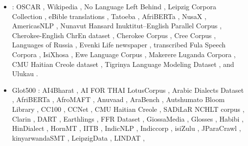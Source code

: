 \documentclass[11pt]{article}
\begin{document}
\begin{itemize}[leftmargin=0.5cm,itemsep=0.1cm,topsep=0.25cm]
\item \citet{chang-etal-2023-multilinguality}:\newline
OSCAR \citep{suarez2019asynchronous,AbadjiOrtizSuarezRomaryetal.2021}, Wikipedia \citep{wikipedia}, No Language Left Behind \citep{costa2022no}, Leipzig Corpora Collection \citep{goldhahn2012building}, eBible translations \citep{eBible}, Tatoeba \citep{tiedemann2012parallel,tiedemann-2020-tatoeba}, AfriBERTa \citep{ogueji2021small},  NusaX \citep{winata2022nusax}, AmericasNLP \citep{mager2021findings}, Nunavut Hansard Inuktitut–English Parallel Corpus \citep{joanis2020inuktitut}, Cherokee-English ChrEn dataset \citep{zhang2020chren}, Cherokee Corpus \citep{cherokee_dict}, Cree Corpus \citep{teodorescu-etal-2022-cree}, Languages of Russia \citep{zaydelman2016}, Evenki Life newspaper \citep{zueva2020finite}, transcribed Fula Speech Corpora \citep{fula2023}, IsiXhosa \citep{isixhosa_ner_corpus}, Ewe Language Corpus \citep{gelr2021}, Makerere Luganda Corpora \citep{mukiibi2022makerere}, CMU Haitian Creole dataset \citep{haitian_cmu}, Tigrinya Language Modeling Dataset \citep{gaim2021monolingual}, and Ulukau \citep{ulukau}.
\item Glot500 \citep{imanigooghari-etal-2023-glot500}:\newline
AI4Bharat \citep{AI4Bharat},
AI FOR THAI LotusCorpus \citep{aiforthai},
Arabic Dialects Dataset \citep{el-haj-etal-2018-arabic},
AfriBERTa \citep{ogueji2021small},
AfroMAFT \citep{adelani-etal-2022-thousand,xue-etal-2021-mt5},
Anuvaad \citep{Anuvaad},
AraBench \citep{sajjad-etal-2020-arabench},
Autshumato \citep{Autshumato}
Bloom Library \citep{DBLP:conf/emnlp/LeongNMFOW22}, 
CC100 \citep{conneau-etal-2020-unsupervised}, 
CCNet \citep{wenzek-etal-2020-ccnet}, 
CMU Haitian Creole \citep{haitian_cmu},
SADiLaR NCHLT corpus \citep{sadilar},
Clarin \citep{clarin},
DART \citep{alsarsour-etal-2018-dart},
Earthlings \citep{DBLP:journals/lre/Dunn20}, 
FFR Dataset \citep{ffr},
GiossaMedia \citep{gongora-etal-2022-use, gongora-etal-2021-experiments},
Glosses \citep{camacho-collados-etal-2016-large},
Habibi \citep{el-haj-2020-habibi},
HinDialect \citep{bafna2022empirical}, 
HornMT \citep{HornMT},
IITB \citep{kunchukuttan-etal-2018-iit},
IndicNLP \citep{nakazawa-etal-2021-overview},
Indiccorp \citep{kakwani2020indicnlpsuite}, 
isiZulu \citep{isizulu},
JParaCrawl \citep{morishita-etal-2020-jparacrawl}, 
kinyarwandaSMT \citep{KinyaSMT},
LeipzigData \citep{goldhahn2012building}, 
LINDAT \citep{lindat},

\end{itemize}
\end{document}
